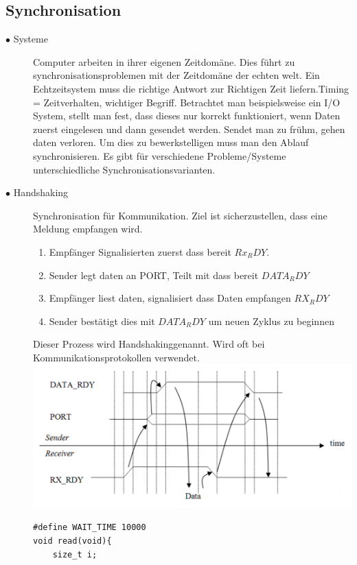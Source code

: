 \documentclass[a4paper, 8pt]{extarticle}
\begin{document}
\begin{multicols*}{3}
		\section{Synchronisation}
					\begin{description}
						\item[$\bullet$ Systeme]
							Computer arbeiten in ihrer eigenen Zeitdomäne. Dies führt zu synchronisationsproblemen mit der Zeitdomäne der echten welt.
							Ein Echtzeitsystem muss die richtige Antwort zur Richtigen Zeit liefern.Timing =  Zeitverhalten, wichtiger Begriff.
							Betrachtet man beispielsweise ein I/O System, stellt man fest, dass dieses nur korrekt funktioniert, wenn Daten zuerst eingelesen und dann gesendet werden.
							Sendet man zu frühm, gehen daten verloren. Um dies zu bewerkstelligen muss man den Ablauf synchronisieren. Es gibt für verschiedene Probleme/Systeme unterschiedliche
							Synchronisationsvarianten.
						\item[$\bullet$ Handshaking]
							Synchronisation für Kommunikation. Ziel ist sicherzustellen, dass eine Meldung empfangen wird. 
							\begin{enumerate}
								\item Empfänger Signalisierten zuerst dass bereit $Rx_RDY$.
								\item Sender legt daten an PORT, Teilt mit dass bereit $DATA_RDY$
								\item Empfänger liest daten, signalisiert dass Daten empfangen $RX_RDY$
								\item Sender bestätigt dies mit $DATA_RDY$ um neuen Zyklus zu beginnen
							\end{enumerate}
							Dieser Prozess wird \dq Handshaking\dq genannt. Wird oft bei Kommunikationsprotokollen verwendet.
							\includegraphics[width=1.1\linewidth,left]{img/Handshaking_Ablauf.PNG}
							\begin{lstlisting}
#define WAIT_TIME 10000
void read(void){
	size_t i;


\end{lstlisting}
\end{description}
\end{multicols*}
\end{document}
